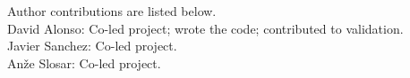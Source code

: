 Author contributions are listed below. \\
David Alonso: Co-led project; wrote the code; contributed to validation. \\
Javier Sanchez: Co-led project. \\
An\v{z}e Slosar: Co-led project. \\
